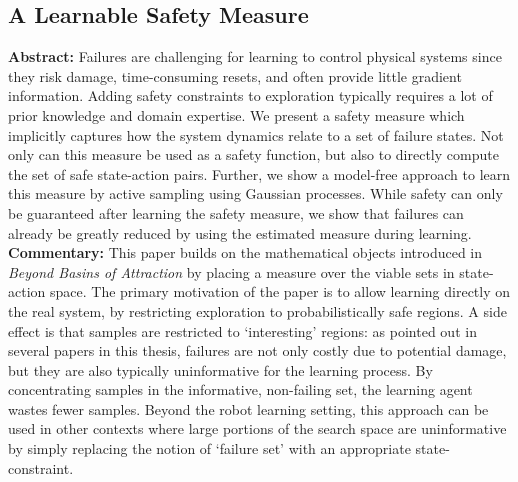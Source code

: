 \subsection{A Learnable Safety Measure}
\textbf{Abstract: }
Failures are challenging for learning to control physical systems since they risk damage, time-consuming resets, and often provide little gradient information. Adding safety constraints to exploration typically requires a lot of prior knowledge and domain expertise. We present a safety measure which implicitly captures how the system dynamics relate to a set of failure states. Not only can this measure be used as a safety function, but also to directly compute the set of safe state-action pairs. Further, we show a model-free approach to learn this measure by active sampling using Gaussian processes. While safety can only be guaranteed after learning the safety measure, we show that failures can already be greatly reduced by using the estimated measure during learning. \\
\textbf{Commentary: }
This paper builds on the mathematical objects introduced in \emph{Beyond Basins of Attraction} by placing a measure over the viable sets in state-action space. The primary motivation of the paper is to allow learning directly on the real system, by restricting exploration to probabilistically safe regions. A side effect is that samples are restricted to `interesting' regions: as pointed out in several papers in this thesis, failures are not only costly due to potential damage, but they are also typically uninformative for the learning process. By concentrating samples in the informative, non-failing set, the learning agent wastes fewer samples. Beyond the robot learning setting, this approach can be used in other contexts where large portions of the search space are uninformative by simply replacing the notion of `failure set' with an appropriate state-constraint. \\
